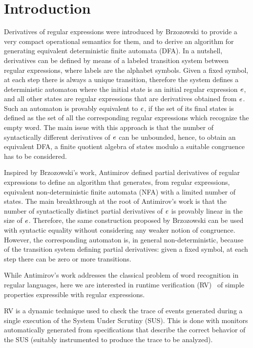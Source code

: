 \section{Introduction}\label{sec:intro}

Derivatives of regular expressions were introduced by Brzozowski \cite{Brzozowski64,OwensEtAl09}
to provide a very compact operational semantics for them, and to derive an algorithm for generating equivalent deterministic finite automata (DFA).
%
In a nutshell, derivatives can be defined by means of a labeled transition system between regular expressions, where labels are the alphabet symbols. Given a fixed symbol, at each step there is always a unique transition, therefore the system defines a deterministic automaton where the initial state is an initial regular expression $\mathit {e}$, and all other states are regular expressions that are derivatives obtained from $\mathit {e}$.
%
Such an automaton is provably equivalent to $\mathit {e}$,
if the set of its final states is defined as the set of all the corresponding regular expressions which recognize the empty word.
The main issue with this approach is that the number of syntactically different derivatives of $\mathit {e}$ can be unbounded, hence, to obtain an equivalent DFA, a finite quotient algebra of states modulo a suitable congruence has to be considered.

Inspired by Brzozowski's work, Antimirov \cite{Antimirov96} defined partial derivatives of regular expressions to define an algorithm that generates, from regular expressions, equivalent non-deterministic finite automata (NFA) with a limited number of states. The main breakthrough at the root of Antimirov's work is that the number of syntactically distinct partial derivatives of $\mathit {e}$ is provably linear in the size of $\mathit {e}$. Therefore, the same construction
proposed by Brzozowski can be used with syntactic equality without considering any weaker notion of congruence. However, the corresponding automaton is, in general non-deterministic, because
of the transition system defining partial derivatives: given a fixed symbol, at each step there can be zero or more transitions.

While Antimirov's work addresses the classical problem of word recognition in regular languages, here we are interested in runtime verification (RV)~\cite{LeuckerSchallhart09} of simple properties expressible with regular expressions.

RV is a dynamic technique used to check the trace of events generated during a single execution of the System Under Scrutiny (SUS). This is done with monitors automatically generated from specifications that describe the correct behavior of the SUS (suitably instrumented to produce the trace to be analyzed).

